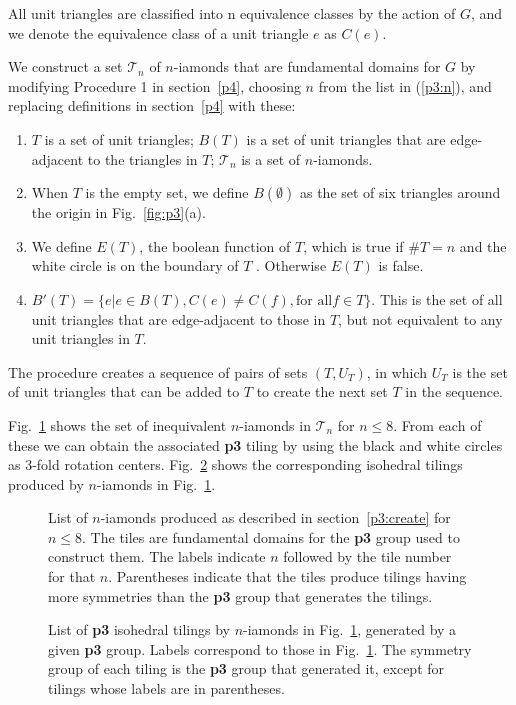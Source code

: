\documentclass{ws-ijcga}
\begin{document}
All unit triangles are classified into n equivalence classes by the action of $G$, and we denote
the equivalence class of a unit triangle $e$ as $C(e)$.

We construct a set $\mathscr{T}_n$ of $n$-iamonds
that are fundamental domains for $G$ by modifying
Procedure 1 in section~\ref{p4}, 
choosing $n$ from the list in (\ref{p3:n}), and replacing definitions in section~\ref{p4} with these:

\begin{enumerate}
\item 
$T$ is a set of unit triangles; $B(T)$ is a set of unit triangles that are edge-adjacent to the
triangles in $T$; $\mathscr{T}_n$ is a set of $n$-iamonds.
\item
When $T$ is the empty set, we define $B(\emptyset)$ as the set of six triangles around the origin in
Fig.~\ref{fig:p3}(a).
\item
We define $E(T)$, the boolean function of $T$, which is true if $\# T = n$ and the white circle is on
the boundary of $T$ . Otherwise $E(T)$ is false.
\item
$B'(T) = \{e | e \in B(T),C(e) \ne C(f), \mbox{for all} f \in T \}$. 
This is the set of all unit triangles that are edge-adjacent to those in $T$, 
but not equivalent to any unit triangles in $T$.
\end{enumerate}
The procedure creates a sequence of pairs of sets $(T, U_T)$, 
in which $U_T$ is the set of unit triangles that can be added to $T$ to
create the next set $T$ in the sequence.

Fig.~\ref{p3fighi} shows the set of inequivalent $n$-iamonds in $\mathscr{T}_n$
for $n \le 8$. From each of these we can
obtain the associated {\bf p3} tiling by using the black and white circles as 3-fold rotation centers.
Fig.~\ref{p3tiling} shows the corresponding isohedral tilings produced by $n$-iamonds in Fig.~\ref{p3fighi}.
\begin{figure}[h]
\centerline{
}
\vspace*{8pt}
\caption{
List of $n$-iamonds produced as described in section~\ref{p3:create} for $n \le 8$. 
The tiles are fundamental domains for the
{\bf p3} group used to construct them. 
The labels indicate $n$ followed by the tile number for that $n$. 
Parentheses indicate that the tiles produce tilings having more symmetries 
than the {\bf p3} group that generates the tilings.
\label{p3fighi}
}
\end{figure}
\begin{figure}[h]
\centerline{
}
\vspace*{8pt}
\caption{
List of {\bf p3} isohedral tilings by $n$-iamonds in Fig.~\ref{p3fighi}, 
generated by a given {\bf p3} group. 
Labels correspond to those in Fig.~\ref{p3fighi}. 
The symmetry group of each tiling is the {\bf p3} group that generated it, 
except for tilings whose labels are in parentheses.
\label{p3tiling}
}
\end{figure}
\end{document}
